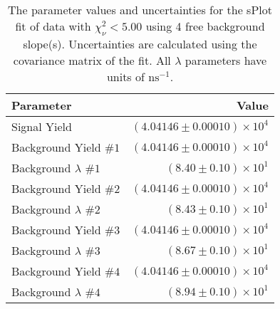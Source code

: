 
\begin{table}
    \begin{center}
        \begin{tabular}{lr}\toprule
            Parameter & Value \\\midrule
            Signal Yield & $(4.04146 \pm 0.00010) \times 10^{4}$ \\
            Background Yield $\#1$ & $(4.04146 \pm 0.00010) \times 10^{4}$ \\
            Background $\lambda$ $\#1$ & $(8.40 \pm 0.10) \times 10^{1}$ \\
            Background Yield $\#2$ & $(4.04146 \pm 0.00010) \times 10^{4}$ \\
            Background $\lambda$ $\#2$ & $(8.43 \pm 0.10) \times 10^{1}$ \\
            Background Yield $\#3$ & $(4.04146 \pm 0.00010) \times 10^{4}$ \\
            Background $\lambda$ $\#3$ & $(8.67 \pm 0.10) \times 10^{1}$ \\
            Background Yield $\#4$ & $(4.04146 \pm 0.00010) \times 10^{4}$ \\
            Background $\lambda$ $\#4$ & $(8.94 \pm 0.10) \times 10^{1}$ \\\bottomrule
        \end{tabular}
        \caption{The parameter values and uncertainties for the sPlot fit of data with $\chi^2_\nu < 5.00$ using 4 free background slope(s). Uncertainties are calculated using the covariance matrix of the fit. All $\lambda$ parameters have units of $\si{\nano\second}^{-1}$.}
    \end{center}
\end{table}
